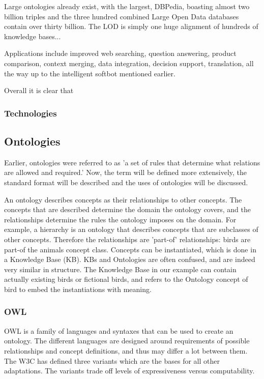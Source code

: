 \documentclass{article}
\begin{document}
 Large ontologies already exist, with the largest, DBPedia, boasting almost two billion triples and the three hundred combined Large Open Data databases contain over thirty billion. \cite{dbpedia, lod} The LOD is simply one huge alignment of hundreds of knowledge bases... %
 
 Applications include improved web searching, question answering, product comparison, context merging, data integration, decision support, translation, all the way up to the intelligent softbot mentioned earlier. %
 
 
 Overall it is clear that %
 \subsubsection{Technologies}
 
 
 \subsection{Ontologies}
 Earlier, ontologies were referred to as 'a set of rules that determine what relations are allowed and required.' Now, the term will be defined more extensively, the standard format will be described and the uses of ontologies will be discussed.
 
 An ontology describes concepts as their relationships to other concepts. The concepts that are described determine the domain the ontology covers, and the relationships determine the rules the ontology imposes on the domain. For example, a hierarchy is an ontology that describes concepts that are subclasses of other concepts. Therefore the relationships are 'part-of' relationships: birds are part-of the animals concept class.
 Concepts can be instantiated, which is done in a Knowledge Base (KB). KBs and Ontologies are often confused, and are indeed very similar in structure. The Knowledge Base in our example can contain actually existing birds or fictional birds, and refers to the Ontology concept of bird to embed the instantiations with meaning.
  
 
 \subsubsection{OWL}
 OWL is a family of languages and syntaxes that can be used to create an ontology. The different languages are designed around requirements of possible relationships and concept definitions, and thus may differ a lot between them. The W3C has defined three variants which are the bases for all other adaptations. The variants trade off levels of expressiveness versus computability.
\end{document}
